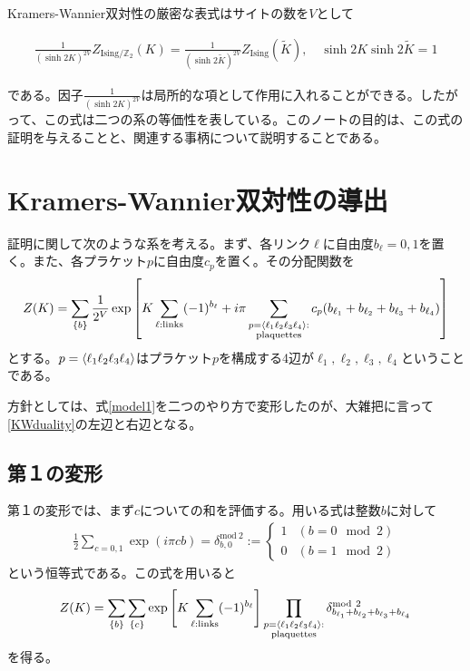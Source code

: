 \documentclass[a4paper,12pt,dvipdfmx]{jlreq}
\newenvironment{important}{\begin{tcolorbox}[
  colback = white,
  colframe = red!35,
  boxrule = 2mm,
  fonttitle = \bfseries,
  after = \noindent] }{\end{tcolorbox}}
\newcommand{\Kt}{\widetilde{K}}
\newcommand{\ZIs}{Z_{\mathrm{Ising}}}
\newcommand{\ZGIs}{Z_{\mathrm{Ising}/\mathbb{Z}_2}}
\newcommand{\deltamod}{\delta^{\mathrm{mod}\ 2}}
\begin{document}
Kramers-Wannier双対性の厳密な表式はサイトの数を$V$として
\begin{important}
  \begin{align}
    \frac{1}{(\sinh 2K)^{2V}}\ZGIs(K)=
    \frac{1}{(\sinh 2\Kt)^{2V}}\ZIs(\Kt),\quad \sinh 2K \sinh 2\Kt=1
    \label{KWduality}
  \end{align}  
\end{important}
である。因子$\frac{1}{(\sinh 2K)^{2V}}$は局所的な項として作用に入れることができる。したがって、この式は二つの系の等価性を表している。このノートの目的は、この式の証明を与えることと、関連する事柄について説明することである。

\section{Kramers-Wannier双対性の導出}
証明に関して次のような系を考える。まず、各リンク$\ell$に自由度$b_{\ell}=0,1$を置く。また、各プラケット$p$に自由度$c_{p}$を置く。その分配関数を
\begin{align}
  Z(K)=\sum_{\{b\}}\frac{1}{2^{V}} \exp\left[
    K\sum_{\ell:\text{links}}(-1)^{b_{\ell}}+i\pi\sum_{\substack{p=\expval{\ell_1 \ell_2 \ell_3 \ell_4}:\\ \text{plaquettes}}} c_{p}(b_{\ell_1}+b_{\ell_2}+b_{\ell_3}+b_{\ell_4})
  \right]
  \label{model1}
\end{align}
とする。$p=\expval{\ell_1 \ell_2 \ell_3 \ell_4}$はプラケット$p$を構成する4辺が$\ell_1, \ell_2, \ell_3, \ell_4$ということである。

方針としては、式\eqref{model1}を二つのやり方で変形したのが、大雑把に言って\eqref{KWduality}の左辺と右辺となる。

\subsection{第１の変形}
第１の変形では、まず$c$についての和を評価する。用いる式は整数$b$に対して 
\begin{align}
  \frac12\sum_{c=0,1}\exp(i\pi c b )
  =\deltamod_{b,0}
  :=
  \begin{cases}
    1& (b=0 \mod 2)\\
    0& (b=1 \mod 2)
  \end{cases}
  \label{deltamod}
\end{align}
という恒等式である。この式を用いると
\begin{align}
  Z(K)=\sum_{\{b\}}\sum_{\{c\}}\exp\left[
    K\sum_{\ell:\text{links}}(-1)^{b_{\ell}}
    \right]
    \prod_{\substack{p=\expval{\ell_1 \ell_2 \ell_3 \ell_4}:\\ \text{plaquettes}}} \deltamod_{b_{\ell_1}+b_{\ell_2}+b_{\ell_3}+b_{\ell_4}}
    \label{model1-1-1}
\end{align}
を得る。
\end{document}
